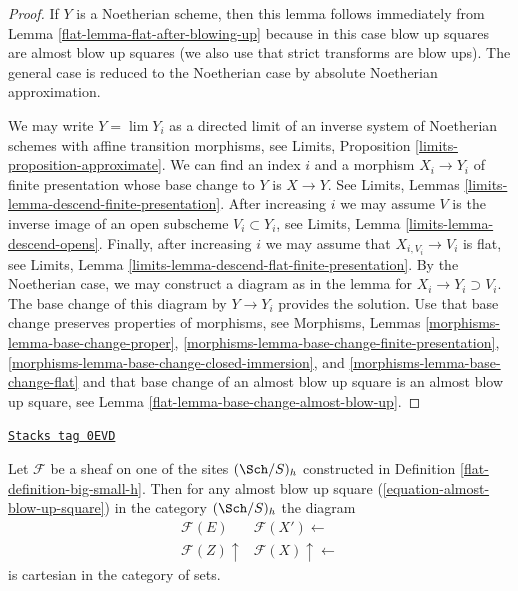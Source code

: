 \begin{proof}

If $Y$ is a Noetherian scheme, then this lemma follows immediately
from Lemma \ref{flat-lemma-flat-after-blowing-up}
because in this case blow up squares are almost blow up squares
(we also use that strict transforms are blow ups).
The general case is reduced to the Noetherian case by
absolute Noetherian approximation.

\medskip\noindent
We may write $Y = \lim Y_i$ as a directed limit of an inverse system
of Noetherian schemes with affine transition morphisms, see
Limits, Proposition \ref{limits-proposition-approximate}.
We can find an index $i$ and a morphism $X_i \to Y_i$
of finite presentation whose base change to $Y$ is $X \to Y$.
See Limits, Lemmas \ref{limits-lemma-descend-finite-presentation}.
After increasing $i$ we may assume $V$ is the inverse image of
an open subscheme $V_i \subset Y_i$, see
Limits, Lemma \ref{limits-lemma-descend-opens}.
Finally, after increasing $i$ we may assume that $X_{i, V_i} \to V_i$
is flat, see
Limits, Lemma \ref{limits-lemma-descend-flat-finite-presentation}.
By the Noetherian case, we may construct a diagram as in the
lemma for $X_i \to Y_i \supset V_i$. The base change of this
diagram by $Y \to Y_i$ provides the solution. Use that base change
preserves properties of morphisms, see Morphisms, Lemmas
\ref{morphisms-lemma-base-change-proper},
\ref{morphisms-lemma-base-change-finite-presentation},
\ref{morphisms-lemma-base-change-closed-immersion}, and
\ref{morphisms-lemma-base-change-flat}
and that base change of an almost
blow up square is an almost blow up square, see
Lemma \ref{flat-lemma-base-change-almost-blow-up}.
\end{proof}

\begin{lemma}
\label{flat-lemma-blow-up-square-h}
\href{https://stacks.math.columbia.edu/tag/0EVD}{\texttt{Stacks tag 0EVD}}

Let $\mathcal{F}$ be a sheaf on one of the sites $(\Sch/S)_h$
constructed in Definition \ref{flat-definition-big-small-h}.
Then for any almost blow up square (\ref{equation-almost-blow-up-square})
in the category $(\Sch/S)_h$ the diagram
$$
\begin{array}{cc}\mathcal{F}(E) & \mathcal{F}(X') \longleftarrow \\ \mathcal{F}(Z) \uparrow & \mathcal{F}(X) \uparrow\longleftarrow\end{array}
$$
is cartesian in the category of sets.
\end{lemma}

